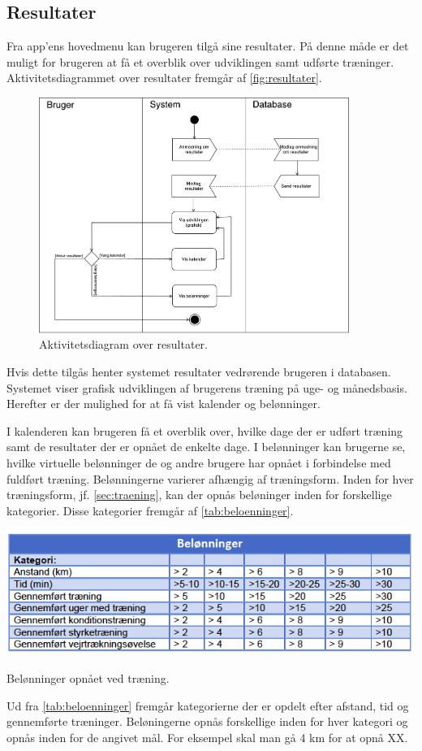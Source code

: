 \subsection{Resultater}
Fra app'ens hovedmenu kan brugeren tilgå sine resultater. På denne måde er det muligt for brugeren at få et overblik over udviklingen samt udførte træninger.
Aktivitetsdiagrammet over resultater fremgår af \autoref{fig:resultater}.

\begin{figure} [H]
\centering
\includegraphics[width=0.9\textwidth]{figures/aktivitetsdiagram/Resultater}
\caption{Aktivitetsdiagram over resultater.}
\label{fig:resultater}
\end{figure}

\noindent
Hvis dette tilgås henter systemet resultater vedrørende brugeren i databasen. Systemet viser grafisk udviklingen af brugerens træning på uge- og månedsbasis. Herefter er der mulighed for at få vist kalender og belønninger. 


I kalenderen kan brugeren få et overblik over, hvilke dage der er udført træning samt de resultater der er opnået de enkelte dage. I belønninger kan brugerne se, hvilke virtuelle belønninger de og andre brugere har opnået i forbindelse med fuldført træning. Belønningerne varierer afhængig af træningsform. Inden for hver træningsform, jf. \autoref{sec:traening}, kan der opnås beløninger inden for forskellige kategorier. Disse kategorier fremgår af \autoref{tab:beloenninger}.

\begin{table} [H]
\centering
\includegraphics[width=1\textwidth]{figures/aktivitetsdiagram/beloeninnger}
\caption{Belønninger opnået ved træning.}
\label{tab:beloenninger}
\end{table}


\noindent
Ud fra \autoref{tab:beloenninger} fremgår kategorierne der er opdelt efter afstand, tid og gennemførte træninger. Beløningerne opnås forskellige inden for hver kategori og opnås inden for de angivet mål. For eksempel skal man gå 4 km for at opnå XX. 
